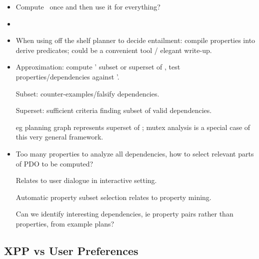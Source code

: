 \begin{itemize}
\item Compute \plans\ once and then use it for everything?

\item {}

\item When using off the shelf planner to decide entailment: compile
  properties into derive predicates; could be a convenient tool /
  elegant write-up.

\item Approximation: compute \plans' subset or superset of \plans, test
  properties/dependencies against \plans'.

  Subset: counter-examples/falsify dependencies.

  Superset: sufficient criteria finding subset of valid dependencies.

  eg planning graph represents superset of \plans; mutex analysis is a
  special case of this very general framework.

\item Too many properties to analyze all dependencies, how to select
  relevant parts of PDO to be computed?

  Relates to user dialogue in interactive setting.

  Automatic property subset selection relates to property mining.

  Can we identify interesting dependencies, ie property pairs rather
  than properties, from example plans?

\end{itemize}





\subsection{XPP vs User Preferences}

